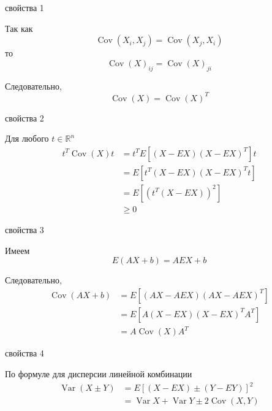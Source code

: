 \documentclass[12pt,a4paper]{article}
\begin{document}
\begin{proofbox}{свойства 1}

Так как
\[
\operatorname{Cov}(X_i,X_j)
=
\operatorname{Cov}(X_j,X_i)
\]
то
\[
\operatorname{Cov}(X)_{ij}
=
\operatorname{Cov}(X)_{ji}
\]

Следовательно,
\[
\operatorname{Cov}(X)
=
\operatorname{Cov}(X)^T
\]

\end{proofbox}

\begin{proofbox}{свойства 2}

Для любого $t\in\mathbb{R}^n$
\[
\begin{aligned}
t^T\operatorname{Cov}(X)t
&=
t^TE[(X-EX)(X-EX)^T]t\\
&=
E\left[t^T(X-EX)(X-EX)^Tt\right]\\
&=
E\left[(t^T(X-EX))^2\right]\\
&\geq0
\end{aligned}
\]

\end{proofbox}

\begin{proofbox}{свойства 3}

Имеем
\[
E(AX+b)=AEX+b
\]

Следовательно,
\[
\begin{aligned}
\operatorname{Cov}(AX+b)
&=
E\left[
(AX-AEX)(AX-AEX)^T
\right]\\
&=
E\left[
A(X-EX)(X-EX)^TA^T
\right]\\
&=
A\operatorname{Cov}(X)A^T
\end{aligned}
\]

\end{proofbox}

\begin{proofbox}{свойства 4}

По формуле для дисперсии линейной комбинации
\[
\begin{aligned}
\operatorname{Var}(X\pm Y)
&=
E\left[
(X-EX)\pm(Y-EY)
\right]^2\\
&=
\operatorname{Var}X+\operatorname{Var}Y
\pm2\operatorname{Cov}(X,Y)
\end{aligned}
\]

\end{proofbox}
\end{document}
